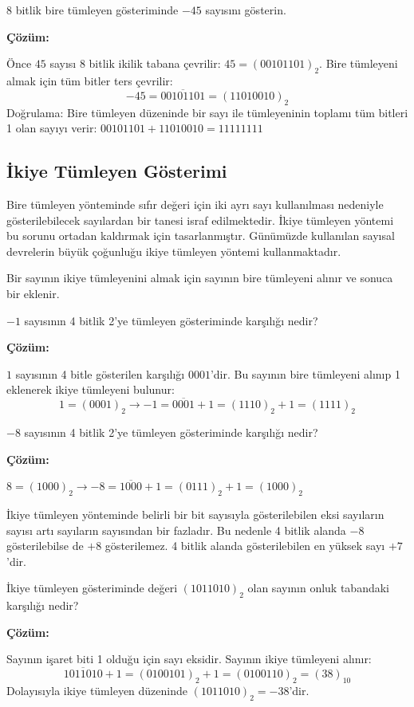 \begin{ornek}[A.11]
8 bitlik bire tümleyen gösteriminde $-45$ sayısını gösterin.

\textbf{Çözüm:}

Önce $45$ sayısı 8 bitlik ikilik tabana çevrilir: $45 = (00101101)_2$. Bire tümleyeni almak için tüm bitler ters çevrilir:
\[
-45 = \overline{00101101} = (11010010)_2
\]
Doğrulama: Bire tümleyen düzeninde bir sayı ile tümleyeninin toplamı tüm bitleri 1 olan sayıyı verir: $00101101 + 11010010 = 11111111$ \checkmark
\end{ornek}

\subsection{İkiye Tümleyen Gösterimi}

Bire tümleyen yönteminde sıfır değeri için iki ayrı sayı kullanılması nedeniyle gösterilebilecek sayılardan bir tanesi israf edilmektedir. İkiye tümleyen yöntemi bu sorunu ortadan kaldırmak için tasarlanmıştır. Günümüzde kullanılan sayısal devrelerin büyük çoğunluğu ikiye tümleyen yöntemi kullanmaktadır.

Bir sayının ikiye tümleyenini almak için sayının bire tümleyeni alınır ve sonuca bir eklenir.

\begin{ornek}[A.12]
$-1$ sayısının 4 bitlik 2'ye tümleyen gösteriminde karşılığı nedir?

\textbf{Çözüm:}

$1$ sayısının 4 bitle gösterilen karşılığı $0001$'dir. Bu sayının bire tümleyeni alınıp 1 eklenerek ikiye tümleyeni bulunur:
\[
1 = (0001)_2 \rightarrow -1 = \overline{0001} + 1 = (1110)_2 + 1 = (1111)_2
\]
\end{ornek}

\begin{ornek}[A.13]
$-8$ sayısının 4 bitlik 2'ye tümleyen gösteriminde karşılığı nedir?

\textbf{Çözüm:}

$8 = (1000)_2 \rightarrow -8 = \overline{1000} + 1 = (0111)_2 + 1 = (1000)_2$

İkiye tümleyen yönteminde belirli bir bit sayısıyla gösterilebilen eksi sayıların sayısı artı sayıların sayısından bir fazladır. Bu nedenle 4 bitlik alanda $-8$ gösterilebilse de $+8$ gösterilemez. 4 bitlik alanda gösterilebilen en yüksek sayı $+7$'dir.
\end{ornek}

\begin{ornek}[A.14]
İkiye tümleyen gösteriminde değeri $(1011010)_2$ olan sayının onluk tabandaki karşılığı nedir?

\textbf{Çözüm:}

Sayının işaret biti 1 olduğu için sayı eksidir. Sayının ikiye tümleyeni alınır:
\[
\overline{1011010} + 1 = (0100101)_2 + 1 = (0100110)_2 = (38)_{10}
\]
Dolayısıyla ikiye tümleyen düzeninde $(1011010)_2 = -38$'dir.
\end{ornek}

